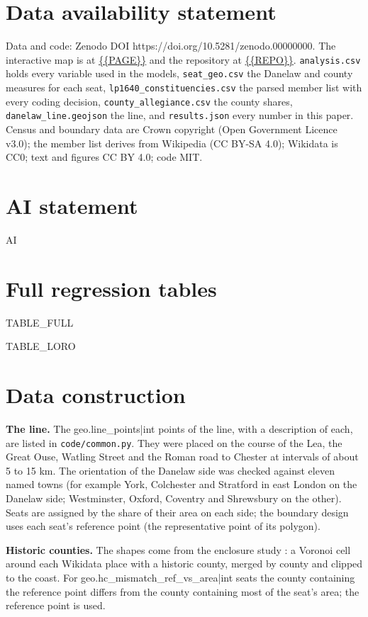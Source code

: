 \documentclass[11pt,a4paper]{article}
\begin{document}
\section*{Data availability statement}
Data and code: Zenodo DOI https://doi.org/10.5281/zenodo.00000000. The interactive map is at \url{{{PAGE}}} and the repository at \url{{{REPO}}}. \texttt{analysis.csv} holds every variable used in the models, \texttt{seat\_geo.csv} the Danelaw and county measures for each seat, \texttt{lp1640\_constituencies.csv} the parsed member list with every coding decision, \texttt{county\_allegiance.csv} the county shares, \texttt{danelaw\_line.geojson} the line, and \texttt{results.json} every number in this paper. Census and boundary data are Crown copyright (Open Government Licence v3.0); the member list derives from Wikipedia (CC BY-SA 4.0); Wikidata is CC0; text and figures CC BY 4.0; code MIT.

\section*{AI statement}
{{AI}}




\appendix
\section{Full regression tables}\label{app:tables}
{{TABLE_FULL}}

{{TABLE_LORO}}
\clearpage

\section{Data construction}\label{app:data}
\textbf{The line.} The {{geo.line_points|int}} points of the line, with a description of each, are listed in \texttt{code/common.py}. They were placed on the course of the Lea, the Great Ouse, Watling Street and the Roman road to Chester at intervals of about 5 to 15 km. The orientation of the Danelaw side was checked against eleven named towns (for example York, Colchester and Stratford in east London on the Danelaw side; Westminster, Oxford, Coventry and Shrewsbury on the other). Seats are assigned by the share of their area on each side; the boundary design uses each seat's reference point (the representative point of its polygon).

\textbf{Historic counties.} The shapes come from the enclosure study \citep{hotham2026enc}: a Voronoi cell around each Wikidata place with a historic county, merged by county and clipped to the coast. For {{geo.hc_mismatch_ref_vs_area|int}} seats the county containing the reference point differs from the county containing most of the seat's area; the reference point is used.
\end{document}
